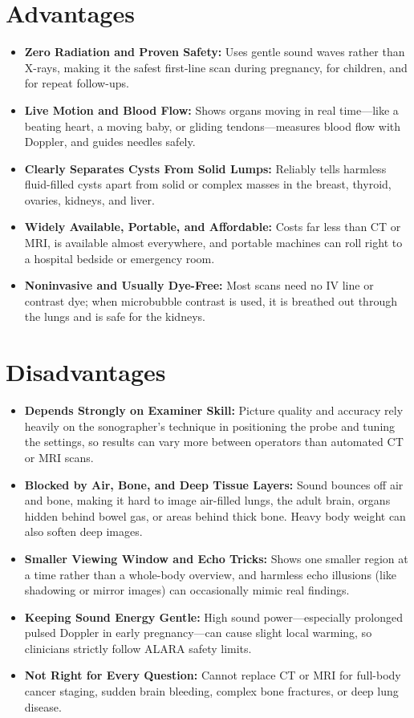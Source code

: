 \section{Advantages}

\begin{itemize}
    \item \textbf{Zero Radiation and Proven Safety:} Uses gentle sound waves rather than X-rays, making it the safest first-line scan during pregnancy, for children, and for repeat follow-ups.
    \item \textbf{Live Motion and Blood Flow:} Shows organs moving in real time---like a beating heart, a moving baby, or gliding tendons---measures blood flow with Doppler, and guides needles safely.
    \item \textbf{Clearly Separates Cysts From Solid Lumps:} Reliably tells harmless fluid-filled cysts apart from solid or complex masses in the breast, thyroid, ovaries, kidneys, and liver.
    \item \textbf{Widely Available, Portable, and Affordable:} Costs far less than CT or MRI, is available almost everywhere, and portable machines can roll right to a hospital bedside or emergency room.
    \item \textbf{Noninvasive and Usually Dye-Free:} Most scans need no IV line or contrast dye; when microbubble contrast is used, it is breathed out through the lungs and is safe for the kidneys.
\end{itemize}

\section{Disadvantages}

\begin{itemize}
    \item \textbf{Depends Strongly on Examiner Skill:} Picture quality and accuracy rely heavily on the sonographer's technique in positioning the probe and tuning the settings, so results can vary more between operators than automated CT or MRI scans.
    \item \textbf{Blocked by Air, Bone, and Deep Tissue Layers:} Sound bounces off air and bone, making it hard to image air-filled lungs, the adult brain, organs hidden behind bowel gas, or areas behind thick bone. Heavy body weight can also soften deep images.
    \item \textbf{Smaller Viewing Window and Echo Tricks:} Shows one smaller region at a time rather than a whole-body overview, and harmless echo illusions (like shadowing or mirror images) can occasionally mimic real findings.
    \item \textbf{Keeping Sound Energy Gentle:} High sound power---especially prolonged pulsed Doppler in early pregnancy---can cause slight local warming, so clinicians strictly follow ALARA safety limits.
    \item \textbf{Not Right for Every Question:} Cannot replace CT or MRI for full-body cancer staging, sudden brain bleeding, complex bone fractures, or deep lung disease.
\end{itemize}

